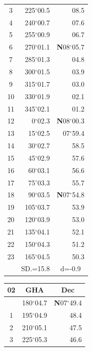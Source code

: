 \documentclass[10pt, a4paper]{report}
\begin{document}
\begin{scriptsize}
\begin{tabular*}{0.2\textwidth}[t]{@{\extracolsep{\fill}}|c|rr|}
3 & 225$^\circ$00.5 & \raisebox{0.24ex}{\boldmath$\cdot$~\boldmath$\cdot$~~}08.5\\
4 & 240$^\circ$00.7 & 07.6\\
5 & 255$^\circ$00.9 & 06.7\\[2Pt]
6 & 270$^\circ$01.1 & \textbf{N}08$^\circ$05.7\\
7 & 285$^\circ$01.3 & 04.8\\
8 & 300$^\circ$01.5 & 03.9\\
9 & 315$^\circ$01.7 & \raisebox{0.24ex}{\boldmath$\cdot$~\boldmath$\cdot$~~}03.0\\
10 & 330$^\circ$01.9 & 02.1\\
11 & 345$^\circ$02.1 & 01.2\\[2Pt]
12 & 0$^\circ$02.3 & \textbf{N}08$^\circ$00.3\\
13 & 15$^\circ$02.5 & 07$^\circ$59.4\\
14 & 30$^\circ$02.7 & 58.5\\
15 & 45$^\circ$02.9 & \raisebox{0.24ex}{\boldmath$\cdot$~\boldmath$\cdot$~~}57.6\\
16 & 60$^\circ$03.1 & 56.6\\
17 & 75$^\circ$03.3 & 55.7\\[2Pt]
18 & 90$^\circ$03.5 & \textbf{N}07$^\circ$54.8\\
19 & 105$^\circ$03.7 & 53.9\\
20 & 120$^\circ$03.9 & 53.0\\
21 & 135$^\circ$04.1 & \raisebox{0.24ex}{\boldmath$\cdot$~\boldmath$\cdot$~~}52.1\\
22 & 150$^\circ$04.3 & 51.2\\
23 & 165$^\circ$04.5 & 50.3\\
\hline
\rule{0pt}{2.4ex} & \multicolumn{1}{c}{SD.=15.8} & \multicolumn{1}{c|}{d=-0.9}\\
\hline
\end{tabular*}\noindent
\begin{tabular*}{0.2\textwidth}[t]{@{\extracolsep{\fill}}|c|rr|}
\hline
\multicolumn{1}{|c|}{\rule{0pt}{2.6ex}\textbf{02}} & \multicolumn{1}{c}{\textbf{GHA}} & \multicolumn{1}{c|}{\textbf{Dec}}\\
\hline\rule{0pt}{2.6ex}\noindent
0 & 180$^\circ$04.7 & \textbf{N}07$^\circ$49.4\\
1 & 195$^\circ$04.9 & 48.4\\
2 & 210$^\circ$05.1 & 47.5\\
3 & 225$^\circ$05.3 & \raisebox{0.24ex}{\boldmath$\cdot$~\boldmath$\cdot$~~}46.6\\

\end{tabular*}
\end{scriptsize}
\end{document}
